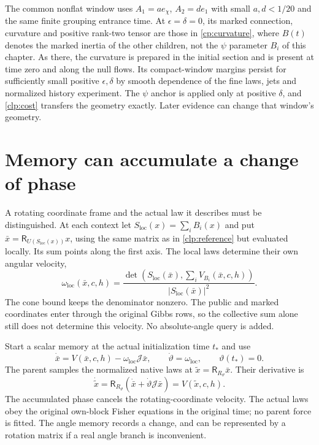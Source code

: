 The common nonflat window uses $A_1=ae_\chi$, $A_2=de_1$ with small $a,d<1/20$ and the same finite grouping entrance time. At $\epsilon=\delta=0$, its marked connection, curvature and positive rank-two tensor are those in \cref{cp:curvature}, where $B(t)$ denotes the marked inertia of the other children, not the $\psi$ parameter $B_i$ of this chapter. As there, the curvature is prepared in the initial section and is present at time zero and along the null flows. Its compact-window margins persist for sufficiently small positive $\epsilon,\delta$ by smooth dependence of the fine laws, jets and normalized history experiment. The $\psi$ anchor is applied only at positive $\delta$, and \cref{clp:cost} transfers the geometry exactly. Later evidence can change that window's geometry.

\section{Memory can accumulate a change of phase}

A rotating coordinate frame and the actual law it describes must be distinguished. At each context let $S_{\mathrm{loc}}(x)=\sum_iB_i(x)$ and put $\bar x=\mathsf R_{U(S_{\mathrm{loc}}(x))}x$, using the same matrix as in \cref{clp:reference} but evaluated locally. Its sum points along the first axis. The local laws determine their own angular velocity,
\begin{equation}
 \omega_{\mathrm{loc}}(\bar x,c,h)
 =\frac{\det(S_{\mathrm{loc}}(\bar x),\sum_iV_{B_i}(\bar x,c,h))}
 {|S_{\mathrm{loc}}(\bar x)|^2}.
 \label{clp:local-velocity}
\end{equation}
The cone bound keeps the denominator nonzero. The public and marked coordinates enter through the original Gibbs rows, so the collective sum alone still does not determine this velocity. No absolute-angle query is added.

Start a scalar memory at the actual initialization time $t_*$ and use
\begin{equation}
 \dot{\bar x}=V(\bar x,c,h)-\omega_{\mathrm{loc}}\mathcal J\bar x,
 \qquad\dot\vartheta=\omega_{\mathrm{loc}},\qquad\vartheta(t_*)=0.
 \label{clp:causal-memory}
\end{equation}
The parent samples the normalized native laws at $\widetilde x=\mathsf R_{R_\vartheta}\bar x$. Their derivative is
\begin{equation}
 \dot{\widetilde x}
 =\mathsf R_{R_\vartheta}(\dot{\bar x}+\dot\vartheta\mathcal J\bar x)
 =V(\widetilde x,c,h).
 \label{clp:causal-native-flow}
\end{equation}
The accumulated phase cancels the rotating-coordinate velocity. The actual laws obey the original own-block Fisher equations in the original time; no parent force is fitted. The angle memory records a change, and can be represented by a rotation matrix if a real angle branch is inconvenient.

